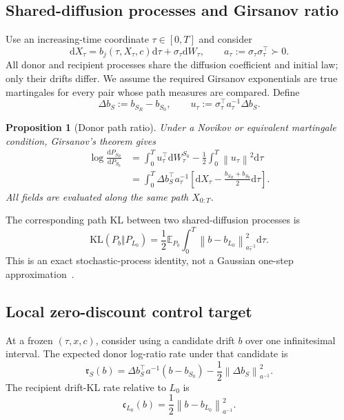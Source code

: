 \documentclass[11pt,a4paper]{article}
\newcommand{\E}{\mathbb{E}}
\newcommand{\KL}{\mathrm{KL}}
\newcommand{\norm}[1]{\left\lVert #1 \right\rVert}
\newcommand{\dd}{\mathrm{d}}
\newcommand{\Sbase}{S_0}
\newcommand{\Srl}{S_R}
\newcommand{\Lbase}{L_0}
\newcommand{\dbS}{\Delta b_S}
\theoremstyle{plain}
\newtheorem{proposition}[theorem]{Proposition}
\theoremstyle{definition}
\begin{document}
\subsection{Shared-diffusion processes and Girsanov ratio}

Use an increasing-time coordinate $\tau\in[0,T]$ and consider
\begin{equation}
\dd X_\tau
=
b_j(\tau,X_\tau,c)\dd\tau
+\sigma_\tau\dd W_\tau,
\qquad
a_\tau:=\sigma_\tau\sigma_\tau^\top\succ0.
\label{eq:continuous-sde}
\end{equation}
All donor and recipient processes share the diffusion coefficient and initial law; only their
drifts differ.  We assume the required Girsanov exponentials are true martingales for every pair
whose path measures are compared.  Define
\begin{equation}
\dbS:=b_{\Srl}-b_{\Sbase},
\qquad
u_\tau:=\sigma_\tau^\top a_\tau^{-1}\dbS.
\label{eq:sde-drift-shift}
\end{equation}

\begin{proposition}[Donor path ratio]
\label{prop:girsanov-ratio}
Under a Novikov or equivalent martingale condition, Girsanov's theorem gives
\begin{align}
\log\frac{\dd P_{\Srl}}{\dd P_{\Sbase}}
&=
\int_0^T u_\tau^\top\dd W_\tau^{\Sbase}
-\frac12\int_0^T\norm{u_\tau}^2\dd\tau
\label{eq:girsanov-brownian}\\
&=
\int_0^T
\dbS^\top a_\tau^{-1}
\left[
\dd X_\tau
-\frac{b_{\Srl}+b_{\Sbase}}{2}\dd\tau
\right].
\label{eq:girsanov-canonical}
\end{align}
All fields are evaluated along the same path $X_{0:T}$.
\end{proposition}

The corresponding path KL between two shared-diffusion processes is
\begin{equation}
\KL(P_b\Vert P_{\Lbase})
=
\frac12
\E_{P_b}
\int_0^T
\norm{b-b_{\Lbase}}_{a_\tau^{-1}}^2
\dd\tau .
\label{eq:girsanov-kl}
\end{equation}
This is an exact stochastic-process identity, not a Gaussian one-step
approximation~\cite{gradualft}.

\subsection{Local zero-discount control target}

At a frozen $(\tau,x,c)$, consider using a candidate drift $b$ over one infinitesimal interval.
The expected donor log-ratio rate under that candidate is
\begin{equation}
\mathfrak r_S(b)
=
\dbS^\top a^{-1}(b-b_{\Sbase})
-\frac12\norm{\dbS}_{a^{-1}}^2.
\label{eq:local-reward-rate}
\end{equation}
The recipient drift-KL rate relative to $\Lbase$ is
\begin{equation}
\mathfrak c_{\Lbase}(b)
=
\frac12\norm{b-b_{\Lbase}}_{a^{-1}}^2.
\label{eq:local-kl-rate}
\end{equation}
\end{document}
